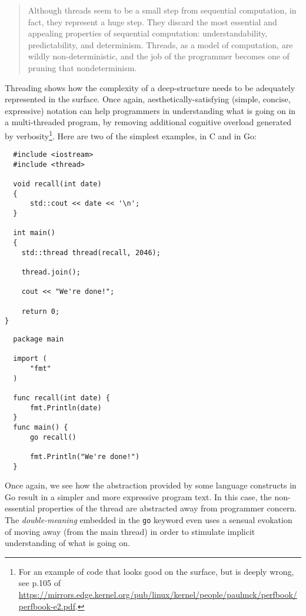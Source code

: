 \documentclass{article}
\begin{document}
\begin{quote}
  Although threads seem to be a small step from sequential computation, in fact, they represent a huge step. They discard the most essential and appealing properties of sequential computation: understandability, predictability, and determinism. Threads, as a model of computation, are wildly non-deterministic, and the job of the programmer becomes one of pruning that nondeterminism\cite{lee_problem_2006}.
\end{quote}

Threading shows how the complexity of a deep-structure needs to be adequately represented in the surface. Once again, aesthetically-satisfying (simple, concise, expressive) notation can help programmers in understanding what is going on in a multi-threaded program, by removing additional cognitive overload generated by verbosity\footnote{For an example of code that looks good on the surface, but is deeply wrong, see p.105 of \url{https://mirrors.edge.kernel.org/pub/linux/kernel/people/paulmck/perfbook/perfbook-e2.pdf}.}. Here are two of the simplest examples, in C and in Go:

\pagebreak

\begin{lstlisting}
  #include <iostream>
  #include <thread>
  
  void recall(int date)
  {
      std::cout << date << '\n';
  }
  
  int main()
  {
    std::thread thread(recall, 2046);

    thread.join();

    cout << "We're done!";
 
    return 0;
}
\end{lstlisting}

\begin{lstlisting}
  package main

  import (  
      "fmt"
  )

  func recall(int date) {  
      fmt.Println(date)
  }
  func main() {  
      go recall()

      fmt.Println("We're done!")
  }
\end{lstlisting}

Once again, we see how the abstraction provided by some language constructs in Go result in a simpler and more expressive program text. In this case, the non-essential properties of the thread are abstracted away from programmer concern. The \emph{double-meaning} embedded in the \lstinline{go} keyword even uses a sensual evokation of moving away (from the main thread) in order to stimulate implicit understanding of what is going on.
\end{document}
